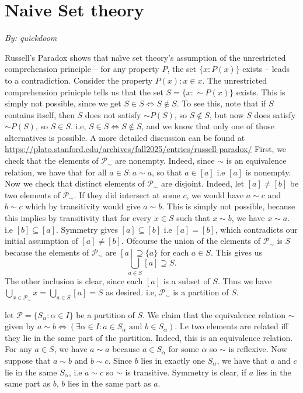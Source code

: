 \section{Naive Set theory}
\emph{By: quickdoom}

\exercise Russell's Paradox shows that na\"{\i}ve set theory's assumption of the unrestricted comprehension principle -- for any property $P$, the set $\{x: P(x)\}$ exists -- leads to a contradiction. Consider the property $P(x): x \in x$. The unrestricted comprehension prinicple tells us that the set $
S = \{x : \sim P(x)\}$ exists. This is simply not possible, since we get $S \in S \iff S\not\in S$.\newline
To see this, note that if $S$ contains itself, then $S$ does not satisfy $\sim P(S)$, so $S\not\in S$, but now $S$ does satisfy $\sim P(S)$, so $S\in S$. i.e, $S\in S\iff S\not\in S$, and we know that only one of those alternatives is possible. A more detailed discussion can be found at \url{https://plato.stanford.edu/archives/fall2025/entries/russell-paradox/}
\exercise First, we check that the elements of $\mathscr{P}_{\sim}$ are nonempty. Indeed, since $\sim$ is an equivalence relation, we have that for all $a\in S: a\sim a$, so that $a\in [a]$ i.e $[a]$ is nonempty. Now we check that distinct elements of $\mathscr{P}_{\sim}$ are disjoint. Indeed, let $[a]\neq [b]$ be two elements of $\mathscr{P}_{\sim}$. If they did intersect at some $c$, we would have $a\sim c$ and $b\sim c$ which by transitivity would give $a\sim b$. This is simply not possible, because this implies by transitivity that for every $x\in S$ such that  $x\sim b$, we have $x\sim a$. i.e $[b]\subseteq [a]$. Symmetry gives $[a]\subseteq [b]$ i.e $[a]=[b]$, which contradicts our initial assumption of $[a]\neq [b]$. Ofcourse the union of the elements of $\mathscr{P}_{\sim}$ is $S$ because the elements of $\mathscr{P}_{\sim}$ are $[a]\supseteq \{a\}$ for each $a\in S$. This gives us \[\bigcup_{a\in S}[a] \supseteq S.\] The other inclusion is clear, since each $[a]$ is a subset of $S$. Thus we have $\bigcup_{x\in \mathscr{P}_{\sim}}x = \bigcup_{a\in S}[a] = S$ as desired. i.e, $\mathscr{P}_{\sim}$ is a partition of $S$.

\exercise let $\mathscr P = \{S_{\alpha} : \alpha\in I\}$ be a partition of $S$. We claim that the equivalence relation $\sim$ given by $a\sim b \iff \left(\exists \alpha\in I : a\in S_\alpha \text{ and } b\in S_\alpha\right)$. I.e two elements are related iff they lie in the same part of the partition. Indeed, this is an equivalence relation. For any $a\in S$, we have $a\sim a$ because $a\in S_\alpha$ for some $\alpha$ so $\sim$ is reflexive. Now suppose that $a\sim b$ and $b\sim c$. Since $b$ lies in exactly one $S_\alpha$, we have that $a$ and $c$ lie in the same $S_\alpha$, i.e $a\sim c$ so $\sim$ is transitive. Symmetry is clear, if $a$ lies in the same part as $b$, $b$ lies in the same part as $a$.

